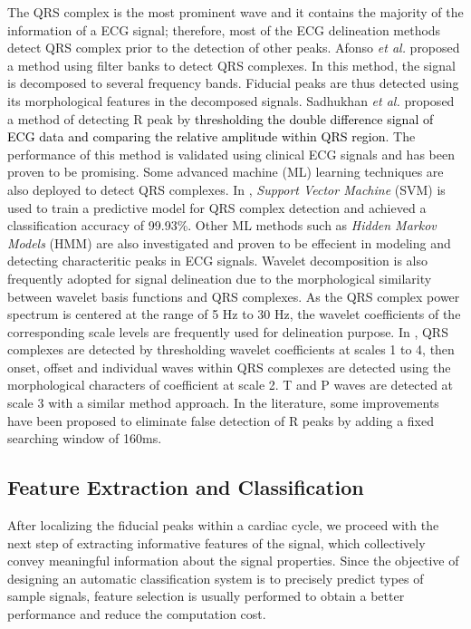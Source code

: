 The QRS complex is the most prominent wave and it contains the majority of the information of a ECG signal; therefore, most of the ECG delineation methods detect QRS complex prior to the detection of other peaks. Afonso \textit{et al.} proposed a method using filter banks to detect QRS complexes\cite{afonso1999ecg}. In this method, the signal is decomposed to several frequency bands. Fiducial peaks are thus detected using its morphological features in the decomposed signals. Sadhukhan \textit{et al.} proposed a method of detecting R peak by \textcolor{black}{thresholding the double difference signal of ECG data and comparing the relative amplitude within QRS region\cite{sadhukhan2012r}}. The performance of this method is validated using clinical ECG signals and has been proven to be promising. Some advanced machine (ML) learning techniques are also deployed to detect QRS complexes. In \cite{mehta2008svm}, \textit{Support Vector Machine} (SVM) is used to train a predictive model for QRS complex detection and achieved a classification accuracy of 99.93\%. Other ML methods such as \textit{Hidden Markov Models} (HMM) are also investigated and proven to be effecient in modeling and detecting characteritic peaks in ECG signals\cite{andreao2006ecg}. Wavelet decomposition is also frequently adopted for signal delineation due to the morphological similarity between wavelet basis functions and QRS complexes. As the QRS complex power spectrum is centered at the range of 5 Hz to 30 Hz, the wavelet coefficients of the corresponding scale levels are frequently used for delineation purpose. In \cite{martinez2004wavelet}, QRS complexes are detected by thresholding wavelet coefficients at scales 1 to 4, then onset, offset and individual waves within QRS complexes are detected using the morphological characters of coefficient at scale 2. T and P waves are detected at scale 3 with a similar method approach. In the literature, some improvements have been proposed to eliminate false detection of R peaks by adding a fixed searching window of 160ms\cite{banerjee2012delineation}. 

\subsection{Feature Extraction and Classification}

After localizing the fiducial peaks within a cardiac cycle, we proceed with the next step of extracting informative features of the signal, which collectively convey meaningful information about the signal properties. %
Since the objective of designing an automatic classification system is to precisely predict types of sample signals, feature selection is usually performed to obtain a better performance and reduce the computation cost\cite{lagerholm2000clustering, prasad2003classification, autofs, ceylan2009novel, osowski2004support}. 

